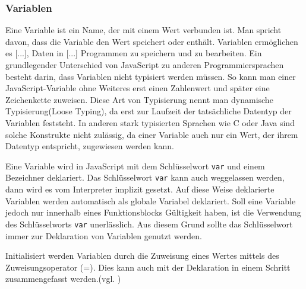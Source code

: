 \subsubsection{Variablen} \glqq Eine Variable ist ein Name, der mit einem Wert verbunden ist. Man spricht davon, dass die Variable den Wert speichert oder enthält. Variablen ermöglichen es [...], Daten in [...] Programmen zu speichern und zu bearbeiten.\grqq{}\cite[S.51]{FlanJava2007} Ein grundlegender Unterschied von JavaScript zu anderen Programmiersprachen besteht darin, dass Variablen nicht typisiert werden müssen. So kann man einer JavaScript-Variable ohne Weiteres erst einen Zahlenwert und später eine Zeichenkette zuweisen. Diese Art von Typisierung nennt man dynamische Typisierung(Loose Typing), da erst zur Laufzeit der tatsächliche Datentyp der Variablen feststeht. In anderen stark typisierten Sprachen wie C oder Java sind solche Konstrukte nicht zulässig, da einer Variable auch nur ein Wert, der ihrem Datentyp entspricht, zugewiesen werden kann.\par Eine Variable wird in JavaScript mit dem Schlüsselwort \texttt{var} und einem Bezeichner deklariert. Das Schlüsselwort \texttt{var} kann auch weggelassen werden, dann wird es vom Interpreter implizit gesetzt. Auf diese Weise deklarierte Variablen werden automatisch als globale Variabel deklariert. Soll eine Variable jedoch nur innerhalb eines Funktionsblocks Gültigkeit haben, ist die Verwendung des Schlüsselworts \texttt{var} unerlässlich. Aus diesem Grund sollte das Schlüsselwort immer zur Deklaration von Variablen genutzt werden.\par Initialisiert werden Variablen durch die Zuweisung eines Wertes mittels des Zuweisungsoperator (=). Dies kann auch mit der Deklaration in einem Schritt zusammengefasst werden.(vgl. \cite[S.52ff]{FlanJava2007})

